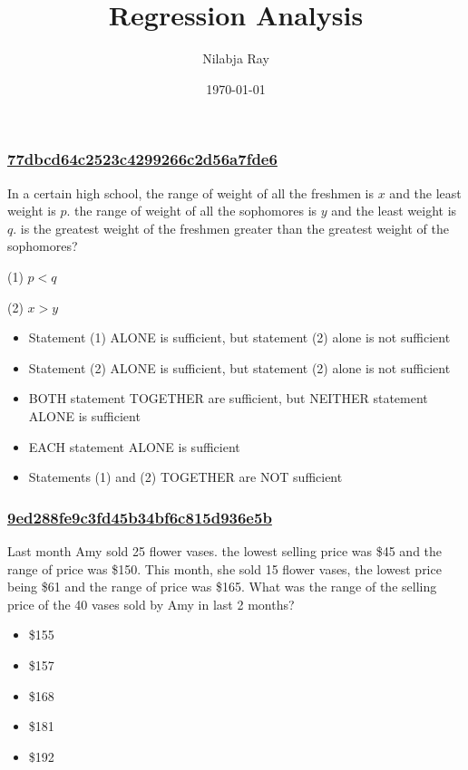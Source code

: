 \documentclass[]{beamer}
\title{Regression Analysis}
\author{Nilabja Ray}
\date{\today}
\begin{document}
\begin{frame}
  \titlepage
\end{frame}
\begin{frame}
    \frametitle{\underline{77dbcd64c2523c4299266c2d56a7fde6}}
    In a certain high school, the range of weight of all the freshmen is $x$ and the least weight is $p$. the range of weight of all the sophomores is $y$ and the least weight is $q$. is the greatest weight of the freshmen greater than the greatest weight of the sophomores?\par
(1) $p<q$\par
(2) $x>y$
    \begin{itemize}
        \item
            Statement (1) ALONE is sufficient, but statement (2) alone is not sufficient
        \item
            Statement (2) ALONE is sufficient, but statement (2) alone is not sufficient
        \item
            BOTH statement TOGETHER are sufficient, but NEITHER statement ALONE is sufficient
        \item
            EACH statement ALONE is sufficient
        \item
            Statements (1) and (2) TOGETHER are NOT sufficient
    \end{itemize}
\end{frame}
\begin{frame}
    \frametitle{\underline{9ed288fe9c3fd45b34bf6c815d936e5b}}
    Last month Amy sold 25 flower vases. the lowest selling price was \$45 and the range of price was \$150. This month, she sold 15 flower vases, the lowest price being \$61 and the range of price was \$165. What was the range of the selling price of the 40 vases sold by Amy in last 2 months?
    \begin{itemize}
        \item
            \$155
        \item
            \$157
        \item
            \$168
        \item
            \$181
        \item
            \$192
    \end{itemize}
\end{frame}
\end{document}
